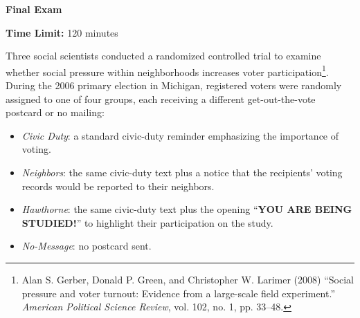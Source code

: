 \documentclass[11pt]{exam}
\newcommand{\exam}{Final Exam}
\begin{document}
\begin{center}

    {\Huge \textbf{\exam{}}}
    \vspace{0.7cm}

    \begin{flushright}
        \textbf{Time Limit:} 120 minutes
    \end{flushright}
    \vspace{-0.2cm}

    
\end{center}

Three social scientists conducted a randomized controlled trial to examine whether social pressure within neighborhoods increases voter participation\footnote{Alan S. Gerber, Donald P. Green, and Christopher W. Larimer (2008) “Social pressure and voter turnout: Evidence from a large-scale field experiment.” \emph{American Political Science Review}, vol. 102, no. 1, pp. 33–48.}. During the 2006 primary election in Michigan, registered voters were randomly assigned to one of four groups, each receiving a different get-out-the-vote postcard or no mailing:
\begin{itemize}[noitemsep]
  \item \emph{Civic Duty}: a standard civic-duty reminder emphasizing the importance of voting.
  \item \emph{Neighbors}: the same civic-duty text plus a notice that the recipients’ voting records would be reported to their neighbors.
  \item \emph{Hawthorne}: the same civic-duty text plus the opening ``\textbf{YOU ARE BEING STUDIED!}'' to highlight their participation on the study.
  \item \emph{No-Message}: no postcard sent.
\end{itemize}
\end{document}
